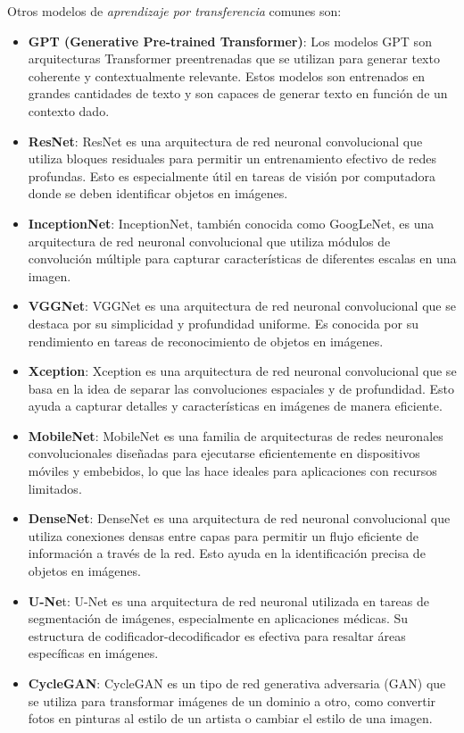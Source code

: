 Otros modelos de \textit{aprendizaje por transferencia} comunes son:
\begin{itemize}
	\item \textbf{GPT (Generative Pre-trained Transformer)}: Los modelos GPT son
	arquitecturas Transformer preentrenadas que se utilizan para generar texto
	coherente y contextualmente relevante. Estos modelos son entrenados en
	grandes cantidades de texto y son capaces de generar texto en función de un
	contexto
	dado.

	\item \textbf{ResNet}: ResNet es una arquitectura de red neuronal
	convolucional que utiliza bloques residuales para permitir un entrenamiento
	efectivo de redes profundas. Esto es especialmente útil en tareas de visión
	por computadora donde se deben identificar objetos en imágenes.
	
	\item \textbf{InceptionNet}: InceptionNet, también conocida como GoogLeNet,
	es una arquitectura de red neuronal convolucional que utiliza módulos de
	convolución múltiple para capturar características de diferentes escalas en
	una imagen.
	
	\item \textbf{VGGNet}: VGGNet es una arquitectura de red neuronal
	convolucional que se destaca por su simplicidad y profundidad uniforme. Es
	conocida por su rendimiento en tareas de reconocimiento de objetos en
	imágenes.
	
	\item \textbf{Xception}: Xception es una arquitectura de red neuronal
	convolucional que se basa en la idea de separar las convoluciones espaciales
	y de profundidad. Esto ayuda a capturar detalles y características en
	imágenes de manera eficiente.
	
	\item \textbf{MobileNet}: MobileNet es una familia de arquitecturas de redes
	neuronales convolucionales diseñadas para ejecutarse eficientemente en
	dispositivos móviles y embebidos, lo que las hace ideales para aplicaciones
	con recursos limitados.
	
	\item \textbf{DenseNet}: DenseNet es una arquitectura de red neuronal
	convolucional que utiliza conexiones densas entre capas para permitir un
	flujo eficiente de información a través de la red. Esto ayuda en la
	identificación precisa de objetos en imágenes.
	
	\item \textbf{U-Ne}t: U-Net es una arquitectura de red neuronal utilizada en
	tareas de segmentación de imágenes, especialmente en aplicaciones médicas.
	Su estructura de codificador-decodificador es efectiva para resaltar áreas
	específicas en imágenes.
	
	\item \textbf{CycleGAN}: CycleGAN es un tipo de red generativa adversaria
	(GAN) que se utiliza para transformar imágenes de un dominio a otro, como
	convertir fotos en pinturas al estilo de un artista o cambiar el estilo de
	una imagen.
\end{itemize}

